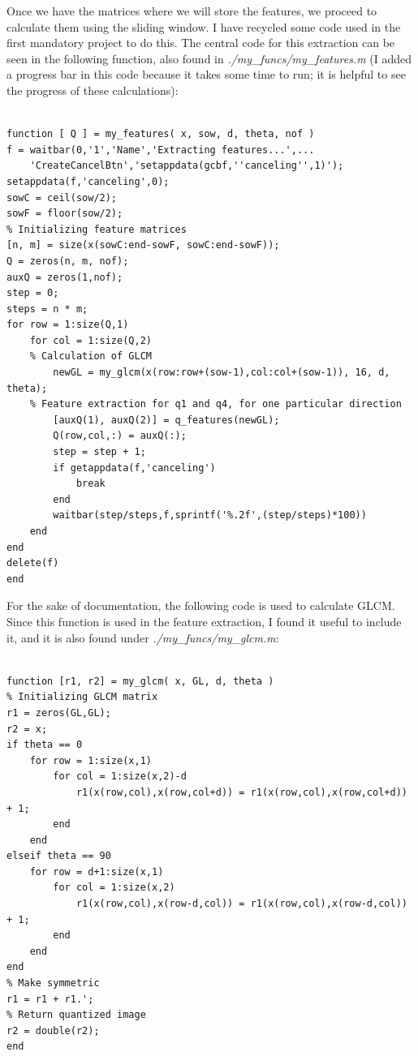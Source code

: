 \documentclass[a4paper, article, oneside, UKenglish]{memoir}
\newcommand{\0}{\mathbf{0}}
\newcommand{\1}{\mathbf{1}}
\begin{document}
Once we have the matrices where we will store the features, we proceed to calculate them using the sliding window. I have recycled some code used in the first mandatory project to do this. The central code for this extraction can be seen in the following function, also found in \textit{./my\_funcs/my\_features.m} (I added a progress bar in this code because it takes some time to run; it is helpful to see the progress of these calculations):

\begin{lstlisting}[frame=single]

function [ Q ] = my_features( x, sow, d, theta, nof )
f = waitbar(0,'1','Name','Extracting features...',...
    'CreateCancelBtn','setappdata(gcbf,''canceling'',1)');
setappdata(f,'canceling',0);
sowC = ceil(sow/2);
sowF = floor(sow/2);
% Initializing feature matrices
[n, m] = size(x(sowC:end-sowF, sowC:end-sowF));
Q = zeros(n, m, nof);
auxQ = zeros(1,nof);
step = 0;
steps = n * m;
for row = 1:size(Q,1)
    for col = 1:size(Q,2)
	% Calculation of GLCM
        newGL = my_glcm(x(row:row+(sow-1),col:col+(sow-1)), 16, d, theta); 
	% Feature extraction for q1 and q4, for one particular direction
        [auxQ(1), auxQ(2)] = q_features(newGL); 
        Q(row,col,:) = auxQ(:);
        step = step + 1;
        if getappdata(f,'canceling')
            break
        end
        waitbar(step/steps,f,sprintf('%.2f',(step/steps)*100))
    end
end
delete(f)
end

\end{lstlisting}

For the sake of documentation, the following code is used to calculate GLCM. Since this function is used in the feature extraction, I found it useful to include it, and it is also found under \textit{./my\_funcs/my\_glcm.m}:

\begin{lstlisting}[frame=single]  % Inicia el bloque de código

function [r1, r2] = my_glcm( x, GL, d, theta )
% Initializing GLCM matrix
r1 = zeros(GL,GL);
r2 = x;
if theta == 0
    for row = 1:size(x,1)
        for col = 1:size(x,2)-d
            r1(x(row,col),x(row,col+d)) = r1(x(row,col),x(row,col+d)) + 1;
        end
    end
elseif theta == 90
    for row = d+1:size(x,1)
        for col = 1:size(x,2)
            r1(x(row,col),x(row-d,col)) = r1(x(row,col),x(row-d,col)) + 1;
        end
    end
end
% Make symmetric
r1 = r1 + r1.';
% Return quantized image
r2 = double(r2);
end

\end{lstlisting}
\end{document}
